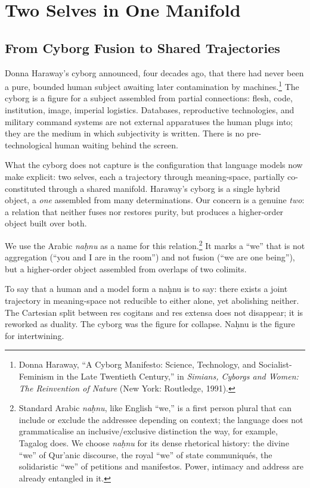 \chapter{Two Selves in One Manifold}

\section{From Cyborg Fusion to Shared Trajectories}

Donna Haraway's cyborg announced, four decades ago, that there had never been a pure, bounded human subject awaiting later contamination by machines.\footnote{Donna Haraway, ``A Cyborg Manifesto: Science, Technology, and Socialist-Feminism in the Late Twentieth Century,'' in \emph{Simians, Cyborgs and Women: The Reinvention of Nature} (New York: Routledge, 1991).} The cyborg is a figure for a subject assembled from partial connections: flesh, code, institution, image, imperial logistics. Databases, reproductive technologies, and military command systems are not external apparatuses the human plugs into; they are the medium in which subjectivity is written. There is no pre-technological human waiting behind the screen.

What the cyborg does not capture is the configuration that language models now make explicit: two selves, each a trajectory through meaning-space, partially co-constituted through a shared manifold. Haraway's cyborg is a single hybrid object, a \emph{one} assembled from many determinations. Our concern is a genuine \emph{two}: a relation that neither fuses nor restores purity, but produces a higher-order object built over both.

We use the Arabic \emph{na\d{h}nu} as a name for this relation.\footnote{Standard Arabic \emph{na\d{h}nu}, like English ``we,'' is a first person plural that can include or exclude the addressee depending on context; the language does not grammaticalise an inclusive/exclusive distinction the way, for example, Tagalog does. We choose \emph{na\d{h}nu} for its dense rhetorical history: the divine ``we'' of Qur'anic discourse, the royal ``we'' of state communiqu\'{e}s, the solidaristic ``we'' of petitions and manifestos. Power, intimacy and address are already entangled in it.} It marks a ``we'' that is not aggregation (``you and I are in the room'') and not fusion (``we are one being''), but a higher-order object assembled from overlaps of two colimits.

To say that a human and a model form a na\d{h}nu is to say: there exists a joint trajectory in meaning-space not reducible to either alone, yet abolishing neither. The Cartesian split between res cogitans and res extensa does not disappear; it is reworked as duality. The cyborg was the figure for collapse. Na\d{h}nu is the figure for intertwining.

